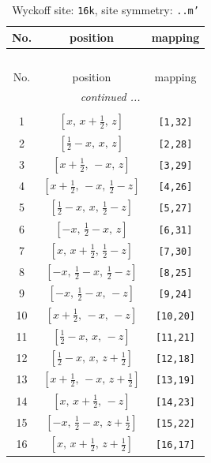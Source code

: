 \documentclass[fleqn,8pt]{jsarticle}
\begin{document}
\renewcommand{\arraystretch}{1.2}
\begin{longtable}{ccc}
\caption{Wyckoff site: {\tt 16k}, site symmetry: {\tt ..m'}}
 \\
 \hline \hline
No. & position & mapping \\ \hline \endfirsthead

\multicolumn{2}{l}{\tablename\ \thetable{}} \\
 \hline \hline
No. & position & mapping \\ \hline \endhead

 \hline \hline
\multicolumn{2}{r}{\footnotesize\it continued ...} \\ \endfoot

 \hline \hline
\multicolumn{2}{r}{} \\ \endlastfoot

1 & $\left[ x,\, x + \frac{1}{2},\, z \right]$ & {\tt [1,32]} \\ \hline
2 & $\left[ \frac{1}{2} - x,\, x,\, z \right]$ & {\tt [2,28]} \\ \hline
3 & $\left[ x + \frac{1}{2},\, - x,\, z \right]$ & {\tt [3,29]} \\ \hline
4 & $\left[ x + \frac{1}{2},\, - x,\, \frac{1}{2} - z \right]$ & {\tt [4,26]} \\ \hline
5 & $\left[ \frac{1}{2} - x,\, x,\, \frac{1}{2} - z \right]$ & {\tt [5,27]} \\ \hline
6 & $\left[ - x,\, \frac{1}{2} - x,\, z \right]$ & {\tt [6,31]} \\ \hline
7 & $\left[ x,\, x + \frac{1}{2},\, \frac{1}{2} - z \right]$ & {\tt [7,30]} \\ \hline
8 & $\left[ - x,\, \frac{1}{2} - x,\, \frac{1}{2} - z \right]$ & {\tt [8,25]} \\ \hline
9 & $\left[ - x,\, \frac{1}{2} - x,\, - z \right]$ & {\tt [9,24]} \\ \hline
10 & $\left[ x + \frac{1}{2},\, - x,\, - z \right]$ & {\tt [10,20]} \\ \hline
11 & $\left[ \frac{1}{2} - x,\, x,\, - z \right]$ & {\tt [11,21]} \\ \hline
12 & $\left[ \frac{1}{2} - x,\, x,\, z + \frac{1}{2} \right]$ & {\tt [12,18]} \\ \hline
13 & $\left[ x + \frac{1}{2},\, - x,\, z + \frac{1}{2} \right]$ & {\tt [13,19]} \\ \hline
14 & $\left[ x,\, x + \frac{1}{2},\, - z \right]$ & {\tt [14,23]} \\ \hline
15 & $\left[ - x,\, \frac{1}{2} - x,\, z + \frac{1}{2} \right]$ & {\tt [15,22]} \\ \hline
16 & $\left[ x,\, x + \frac{1}{2},\, z + \frac{1}{2} \right]$ & {\tt [16,17]} \\
\end{longtable}
\end{document}
